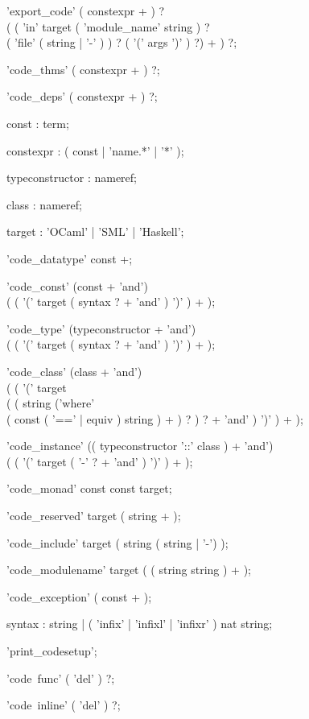 \begin{rail}
'export\_code' ( constexpr + ) ? \\
  ( ( 'in' target ( 'module\_name' string ) ? \\
      ( 'file' ( string | '-' ) ) ? ( '(' args ')' ) ?) + ) ?;

'code\_thms' ( constexpr + ) ?;

'code\_deps' ( constexpr + ) ?;

const : term;

constexpr : ( const | 'name.*' | '*' );

typeconstructor : nameref;

class : nameref;

target : 'OCaml' | 'SML' | 'Haskell';

'code\_datatype' const +;

'code\_const' (const + 'and') \\
  ( ( '(' target ( syntax ? + 'and' ) ')' ) + );

'code\_type' (typeconstructor + 'and') \\
  ( ( '(' target ( syntax ? + 'and' ) ')' ) + );

'code\_class' (class + 'and') \\
  ( ( '(' target \\
    ( ( string ('where' \\
      ( const ( '==' | equiv ) string ) + ) ? ) ? + 'and' ) ')' ) + );

'code\_instance' (( typeconstructor '::' class ) + 'and') \\
  ( ( '(' target ( '-' ? + 'and' ) ')' ) + );

'code\_monad' const const target;

'code\_reserved' target ( string + );

'code\_include' target ( string ( string | '-') );

'code\_modulename' target ( ( string string ) + );

'code\_exception' ( const + );

syntax : string | ( 'infix' | 'infixl' | 'infixr' ) nat string;

'print\_codesetup';

'code\ func' ( 'del' ) ?;

'code\ inline' ( 'del' ) ?;
\end{rail}

